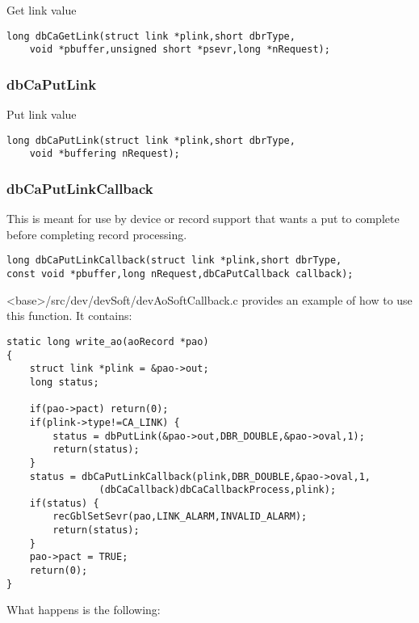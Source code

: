Get link value

\begin{verbatim}long dbCaGetLink(struct link *plink,short dbrType,
    void *pbuffer,unsigned short *psevr,long *nRequest);
\end{verbatim}\subsubsection{dbCaPutLink}

Put link value

\begin{verbatim}long dbCaPutLink(struct link *plink,short dbrType,
    void *buffering nRequest);
\end{verbatim}\subsubsection{dbCaPutLinkCallback}

This is meant for use by device or record support that wants a put to complete before completing record processing.

\begin{verbatim}long dbCaPutLinkCallback(struct link *plink,short dbrType,
const void *pbuffer,long nRequest,dbCaPutCallback callback);
\end{verbatim}\textless{}base\textgreater{}/src/dev/devSoft/devAoSoftCallback.c provides an example of how to use this function. It contains:

\begin{verbatim}
static long write_ao(aoRecord *pao)
{
    struct link *plink = &pao->out;
    long status;

    if(pao->pact) return(0);
    if(plink->type!=CA_LINK) {
        status = dbPutLink(&pao->out,DBR_DOUBLE,&pao->oval,1);
        return(status);
    }
    status = dbCaPutLinkCallback(plink,DBR_DOUBLE,&pao->oval,1,
                (dbCaCallback)dbCaCallbackProcess,plink);
    if(status) {
        recGblSetSevr(pao,LINK_ALARM,INVALID_ALARM);
        return(status);
    }
    pao->pact = TRUE;
    return(0);
}
\end{verbatim}

What happens is the following:

